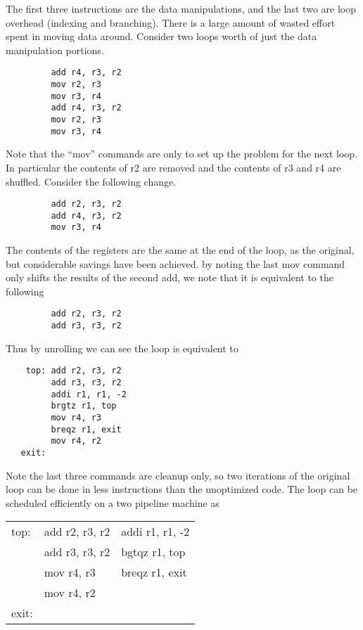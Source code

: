 The first three instructions are the data manipulations, and the last two are loop overhead (indexing and branching).  There is a large amount of wasted effort spent in moving data around.  Consider two loops worth of just the data manipulation portions.

\begin{verbatim}
         add r4, r3, r2
         mov r2, r3
         mov r3, r4
         add r4, r3, r2
         mov r2, r3
         mov r3, r4
\end{verbatim}

Note that the ``mov'' commands are only to set up the problem for the next loop.  In particular the contents of r2 are removed and the contents of r3 and r4 are shuffled.  Consider the following change.

\begin{verbatim}
         add r2, r3, r2
         add r4, r3, r2
         mov r3, r4
\end{verbatim}

The contents of the registers are the same at the end of the loop, as the original, but considerable savings have been achieved.  by noting the last mov command only shifts the results of the second add, we note that it is equivalent to the following

\begin{verbatim}
         add r2, r3, r2
         add r3, r3, r2
\end{verbatim}

Thus by unrolling we can see the loop is equivalent to


\begin{verbatim}
    top: add r2, r3, r2
         add r3, r3, r2
         addi r1, r1, -2
         brgtz r1, top
         mov r4, r3
         breqz r1, exit
         mov r4, r2
   exit:
\end{verbatim}

Note the last three commands are cleanup only, so two iterations of the original loop can be done in less instructions than the unoptimized code. The loop can be scheduled efficiently on a two pipeline machine as

\begin{tabular}{lll}
top:  & add r2, r3, r2 & addi r1, r1, -2 \\
      & add r3, r3, r2 & bgtqz r1, top   \\
      & mov r4, r3     & breqz r1, exit  \\
      & mov r4, r2     &                 \\
exit: &                &                 \\
\end{tabular}



